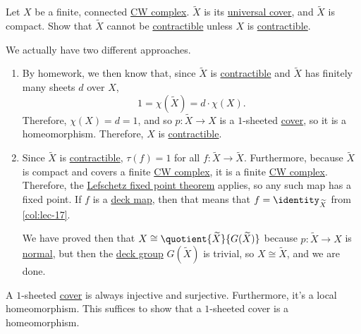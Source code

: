 \begin{eg}[QR May 2016]
	Let \(X\) be a finite, connected \hyperref[def:CW-Complex]{CW complex}. \(\widetilde{X}\) is its \hyperref[def:universal-covering]{universal cover},
	and \(\widetilde{X}\) is compact. Show that \(\widetilde{X}\) cannot be \hyperref[def:contractible]{contractible} unless \(X\) is \hyperref[def:contractible]{contractible}.
\end{eg}
\begin{explanation}
	We actually have two different approaches.
	\begin{enumerate}
		\item By homework, we then know that, since \(\widetilde{X}\) is \hyperref[def:contractible]{contractible} and \(\widetilde{X}\)
		      has finitely many sheets \(d\) over \(X\),
		      \[
			      1 = \chi(\widetilde{X}) = d \cdot \chi(X).
		      \]
		      Therefore, \(\chi(X) = d = 1\), and so \(p \colon \widetilde{X} \to X\) is a \(1\)-sheeted \hyperref[def:covering-map]{cover}, so
		      it is a homeomorphism. Therefore, \(X\) is \hyperref[def:contractible]{contractible}.
		\item Since \(\widetilde{X}\) is \hyperref[def:contractible]{contractible}, \(\tau(f) = 1\) for all \(f \colon \widetilde{X} \to \widetilde{X}\).
		      Furthermore, because \(\widetilde{X}\) is compact and covers a finite \hyperref[def:CW-Complex]{CW complex}, it is a finite \hyperref[def:CW-Complex]{CW complex}.
		      Therefore, the \hyperref[thm:Lefschetz-fixed-point]{Lefschetz fixed point theorem} applies, so any such map has a fixed point. If \(f\) is a
		      \hyperref[def:deck-transformation]{deck map}, then that means that \(f = \identity_{\widetilde{X}}\) from \autoref{col:lec-17}.

		      We have proved then that \(X \cong \quotient{\widetilde{X}}{G(\widetilde{X})}\) because \(p \colon \widetilde{X} \to X\) is \hyperref[def:normal-cover]{normal},
		      but then the \hyperref[def:deck-transformation]{deck group} \(G(\widetilde{X})\) is trivial, so \(X \cong \widetilde{X}\), and we are done.
	\end{enumerate}
\end{explanation}
\begin{exercise}
	A \(1\)-sheeted \hyperref[def:covering-map]{cover} is always injective and surjective. Furthermore, it's a local homeomorphism.
	This suffices to show that a \(1\)-sheeted cover is a homeomorphism.
\end{exercise}

